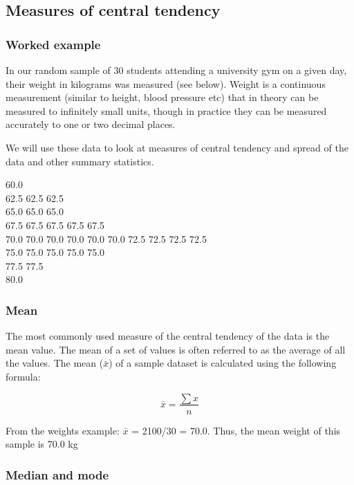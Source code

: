 \documentclass[
]{memoir}
\begin{document}
\hypertarget{measures-of-central-tendency}{%
\subsection{Measures of central tendency}\label{measures-of-central-tendency}}

\hypertarget{worked-example-1}{%
\subsubsection{Worked example}\label{worked-example-1}}

In our random sample of 30 students attending a university gym on a given day, their weight in kilograms was measured (see below). Weight is a continuous measurement (similar to height, blood pressure etc) that in theory can be measured to infinitely small units, though in practice they can be measured accurately to one or two decimal places.

We will use these data to look at measures of central tendency and spread of the data and other summary statistics.

60.0\\
62.5 62.5 62.5\\
65.0 65.0 65.0\\
67.5 67.5 67.5 67.5 67.5\\
70.0 70.0 70.0 70.0 70.0 70.0
72.5 72.5 72.5 72.5\\
75.0 75.0 75.0 75.0 75.0\\
77.5 77.5\\
80.0

\hypertarget{mean}{%
\subsubsection{Mean}\label{mean}}

The most commonly used measure of the central tendency of the data is the mean value. The mean of a set of values is often referred to as the average of all the values. The mean (\(\bar{x}\)) of a sample dataset is calculated using the following formula:

\[\bar{x} = \frac{\sum x}{n}\]

From the weights example: \(\bar{x}\) = 2100/30 = 70.0. Thus, the mean weight of this sample is 70.0 kg

\hypertarget{median-and-mode}{%
\subsubsection{Median and mode}\label{median-and-mode}}
\end{document}
